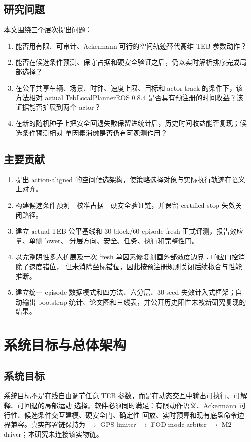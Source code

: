 \documentclass[12pt,a4paper,oneside]{report}
\begin{document}
\section{研究问题}
本文围绕三个层次提出问题：
\begin{enumerate}
  \item 能否用有限、可审计、Ackermann 可行的空间轨迹替代高维 TEB 参数动作？
  \item 能否在候选条件预测、保守占据和硬安全验证之后，仍以实时解析排序完成局部选择？
  \item 在公平共享车辆、场景、时钟、速度上限、目标和 actor track 的条件下，该方法相对 actual
  TebLocalPlannerROS 0.8.4 是否具有预注册的时间收益？该证据能否扩展到两个 actor？
  \item 在新的随机种子上把安全回退失败保留进统计后，历史时间收益能否复现；候选条件预测相对
  单因素消融是否仍有可观测作用？
\end{enumerate}

\section{主要贡献}
\begin{enumerate}
  \item 提出 action-aligned 的空间候选架构，使策略选择对象与实际执行轨迹在语义上对齐。
  \item 构建候选条件预测---校准占据---硬安全验证链，并保留 certified-stop 失效关闭路径。
  \item 建立 actual TEB 公平基线和 30-block/60-episode fresh 正式评测，报告效应量、单侧 lower、
  分层方向、安全、任务、执行和完整性门。
  \item 以完整阴性多人扩展及一次 fresh 单因素修复刻画外部效度边界：响应门控消除了速度错位，
  但未消除坐标错位，因此按预注册规则关闭后续拟合与性能推断。
  \item 建立统一 episode 数据模式和四方法、六分层、30-seed 失效计入式框架；自动输出 bootstrap
  统计、论文图和三线表，并公开历史阳性未被新研究复现的结果。
\end{enumerate}

\chapter{系统目标与总体架构}
\section{系统目标}
系统目标不是在线自由调节任意 TEB 参数，而是在动态交互中输出可执行、可解释、可回退的局部运动
选择。软件必须同时满足：有限动作语义、Ackermann 可行性、候选条件交互建模、硬安全门、确定性
回放、实时预算和现有底盘命令边界兼容。真实部署链保持为
 $\rightarrow$ GPS limiter $\rightarrow$ FOD mode arbiter
$\rightarrow$ M2 driver；本研究未连接该实物链。
\end{document}
